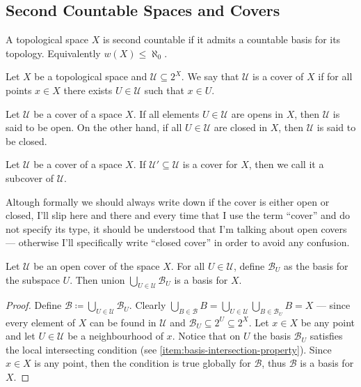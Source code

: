 \subsection{Second Countable Spaces and Covers}

\begin{definition}\label{def: second countable}
  A topological space \(X\) is second countable if it admits a countable basis
  for its topology. Equivalently \(w(X) \leq \aleph_0\).
\end{definition}

\begin{definition}[Cover]\label{def: cover}
  Let \(X\) be a topological space and \(\mathcal U \subseteq 2^X\). We say that
  \(\mathcal U\) is a cover of \(X\) if for all points \(x \in X\) there exists
  \(U \in \mathcal U\) such that \(x \in U\).
\end{definition}

\begin{definition}
  Let \(\mathcal U\) be a cover of a space \(X\). If all elements \(U \in
  \mathcal U\) are opens in \(X\), then \(\mathcal U\) is said to be open. On
  the other hand, if all \(U \in \mathcal U\) are closed in \(X\), then
  \(\mathcal U\) is said to be closed.
\end{definition}

\begin{definition}[Subcover]
  Let \(\mathcal U\) be a cover of a space \(X\). If \(\mathcal U' \subseteq
  \mathcal U\) is a cover for \(X\), then we call it a subcover of \(\mathcal
  U\).
\end{definition}

Altough formally we should always write down if the cover is either open or
closed, I'll slip here and there and every time that I use the term ``cover''
and do not specify its type, it should be understood that I'm talking about open
covers --- otherwise I'll specifically write ``closed cover'' in order to avoid
any confusion.

\begin{proposition}
\label{prop:union-cover-basis}
Let \(\mathcal U\) be an open cover of the space \(X\). For all \(U \in \mathcal
U\), define \(\mathcal{B}_U\) as the basis for the subspace \(U\). Then union
\(\bigcup_{U \in \mathcal U} \mathcal{B}_U\) is a basis for \(X\).
\end{proposition}

\begin{proof}
Define \(\mathcal B \coloneq \bigcup_{U \in \mathcal U} \mathcal B_{U}\).
Clearly \(\bigcup_{B \in \mathcal B} B = \bigcup_{U \in \mathcal U} \bigcup_{B
\in \mathcal B_U} B = X\) --- since every element of \(X\) can be found in
\(\mathcal U\) and \(\mathcal B_U \subseteq 2^U \subseteq 2^{X}\). Let \(x \in
X\) be any point and let \(U \in \mathcal U\) be a neighbourhood of
\(x\). Notice that on \(U\) the basis \(\mathcal B_U\) satisfies the local
intersecting condition (see \cref{item:basis-intersection-property}). Since \(x
\in X\) is any point, then the condition is true globally for \(\mathcal B\),
thus \(\mathcal B\) is a basis for \(X\).
\end{proof}

